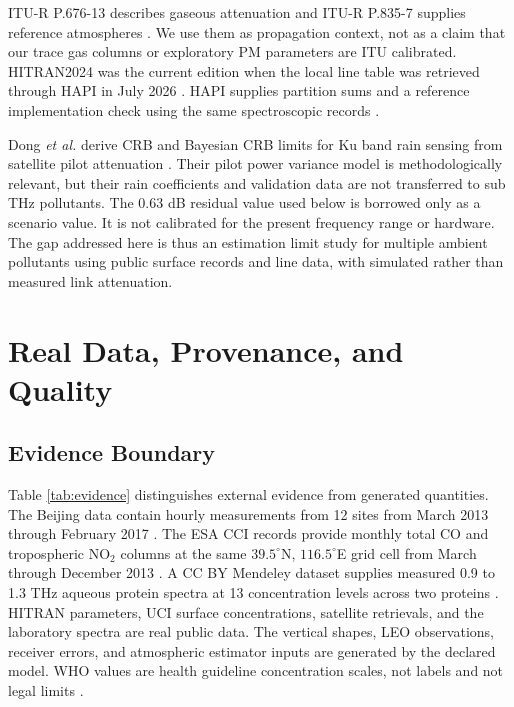 \documentclass[conference]{IEEEtran}
\begin{document}
ITU-R P.676-13 describes gaseous attenuation and ITU-R P.835-7 supplies reference atmospheres \cite{itu676,itu835}. We use them as propagation context, not as a claim that our trace gas columns or exploratory PM parameters are ITU calibrated. HITRAN2024 was the current edition when the local line table was retrieved through HAPI in July 2026 \cite{gordon2026hitran}. HAPI supplies partition sums and a reference implementation check using the same spectroscopic records \cite{kochanov2016hapi}.

Dong \emph{et al.} derive CRB and Bayesian CRB limits for Ku band rain sensing from satellite pilot attenuation \cite{dong2026rain}. Their pilot power variance model is methodologically relevant, but their rain coefficients and validation data are not transferred to sub THz pollutants. The 0.63 dB residual value used below is borrowed only as a scenario value. It is not calibrated for the present frequency range or hardware. The gap addressed here is thus an estimation limit study for multiple ambient pollutants using public surface records and line data, with simulated rather than measured link attenuation.

\section{Real Data, Provenance, and Quality}

\subsection{Evidence Boundary}

Table \ref{tab:evidence} distinguishes external evidence from generated quantities. The Beijing data contain hourly measurements from 12 sites from March 2013 through February 2017 \cite{chen2017beijing}. The ESA CCI records provide monthly total CO and tropospheric NO$_2$ columns at the same $39.5^\circ$N, $116.5^\circ$E grid cell from March through December 2013 \cite{esacciCO,esacciNO2}. A CC BY Mendeley dataset supplies measured 0.9 to 1.3 THz aqueous protein spectra at 13 concentration levels across two proteins \cite{hattori2024data}. HITRAN parameters, UCI surface concentrations, satellite retrievals, and the laboratory spectra are real public data. The vertical shapes, LEO observations, receiver errors, and atmospheric estimator inputs are generated by the declared model. WHO values are health guideline concentration scales, not labels and not legal limits \cite{who2021aqg}.
\end{document}
